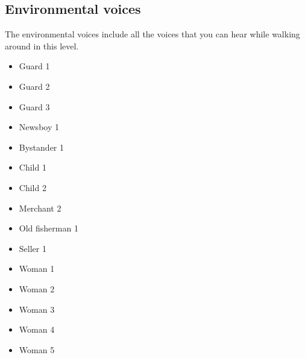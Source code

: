 \subsection{Environmental voices}
The environmental voices include all the voices that you can hear while walking around in this level.
\begin{itemize}
	\item Guard 1
	\item Guard 2
	\item Guard 3
	\item Newsboy 1
	\item Bystander 1
	\item Child 1
	\item Child 2
	\item Merchant 2
	\item Old fisherman 1
	\item Seller 1
	\item Woman 1
	\item Woman 2
	\item Woman 3
	\item Woman 4
	\item Woman 5
\end{itemize}
